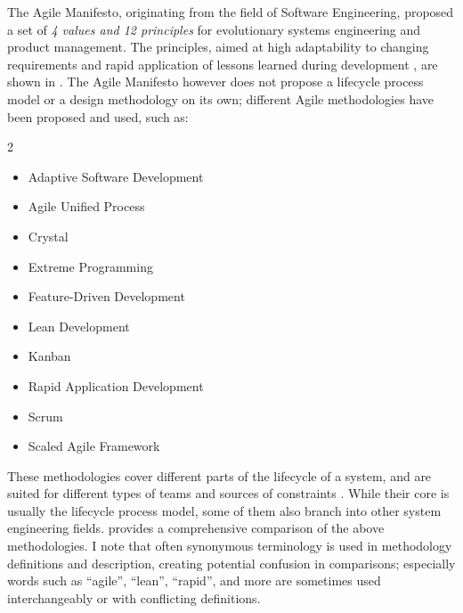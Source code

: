 \documentclass[a4paper,nobib,justified,final]{tufte-book}
\begin{document}
The Agile Manifesto, originating from the field of Software Engineering, proposed a set of \emph{4 values and 12 principles} for evolutionary systems engineering and product management. The principles, aimed at high adaptability to changing requirements and rapid application of lessons learned during development \autocite{sebok_drivers}, are shown in \cite{beckAgileManifesto2001}. The Agile Manifesto however does not propose a lifecycle process model or a design methodology on its own; different Agile methodologies have been proposed and used, such as: \NextCitationOffset{-0.5cm}\autocite{boehmBalancingAgilityDiscipline2004} %
\begin{fullwidth}
\begin{multicols}{2}
\begin{itemize}[itemsep=-2ex]
	\item Adaptive Software Development
	\item Agile Unified Process
	\item Crystal
	\item Extreme Programming \cite{beckExtremeProgrammingExplained2008}
	\item Feature-Driven Development
	\item Lean Development
	\item Kanban
	\item Rapid Application Development
	\item Scrum \cite{schwaverDefinitiveGuideScrum2020}
	\item Scaled Agile Framework
\end{itemize}
\end{multicols}
\end{fullwidth}

These methodologies cover different parts of the lifecycle of a system, and are suited for different types of teams and sources of constraints \autocite{boehmBalancingAgilityDiscipline2004,abrahamssonAgileSoftwareDevelopment2017}.
While their core is usually the lifecycle process model, some of them also branch into other system engineering fields. \citeauthor{boehmBalancingAgilityDiscipline2004} \cite{boehmBalancingAgilityDiscipline2004} provides a comprehensive comparison of the above methodologies.
I note that often synonymous terminology is used in methodology definitions and description, creating potential confusion in comparisons; especially words such as ``agile'', ``lean'', ``rapid'', and more are sometimes used interchangeably or with conflicting definitions. 
\end{document}

